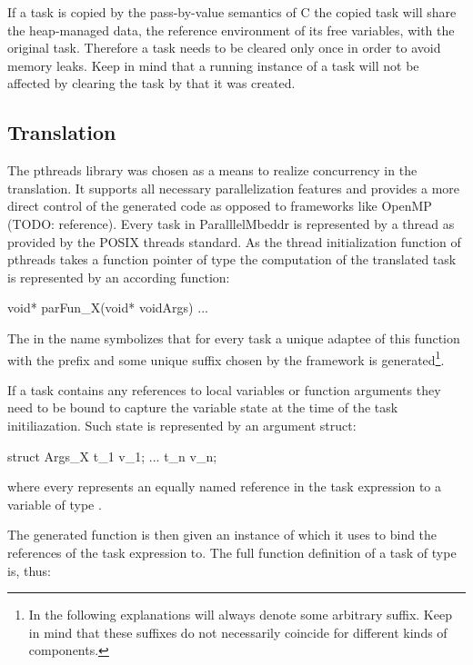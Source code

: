 If a task is copied by the pass-by-value semantics of C the copied task will share the heap-managed data, the reference environment of its free variables, with the original task. Therefore a task needs to be cleared only once in order to avoid memory leaks. Keep in mind that a running instance of a task will not be affected by clearing the task by that it was created. 

\subsection{Translation}
The pthreads library was chosen as a means to realize concurrency in the translation. It supports all necessary parallelization features and provides a more direct control of the generated code as opposed to frameworks like OpenMP (TODO: reference). Every task in ParalllelMbeddr is represented by a thread as provided by the POSIX threads standard. As the thread initialization function of pthreads takes a function pointer of type  the computation of the translated task is represented by an according function:
\begin{ccode}
void* parFun_X(void* voidArgs) {...}
\end{ccode}

The  in the name symbolizes that for every task a unique adaptee of this function with the prefix  and some unique suffix chosen by the framework is generated\footnote{In the following explanations  will always denote some arbitrary suffix. Keep in mind that these suffixes do not necessarily coincide for different kinds of components.}.

If a task contains any references to local variables or function arguments they need to be bound to capture the variable state at the time of the task initiliazation. Such state is represented by an argument struct:

\begin{ccode}
struct Args_X {
  t_1 v_1;
  ...
  t_n v_n;
}
\end{ccode}

where every  represents an equally named reference in the task expression to a variable of type .

The generated function  is then given an instance of  which it uses to bind the references of the task expression to. The full function definition of a task  of type  is, thus:

